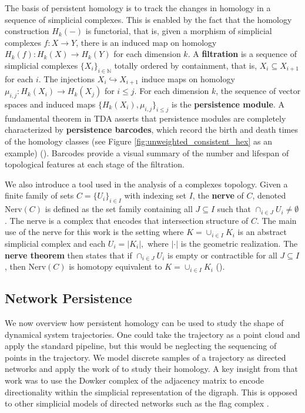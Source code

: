 \documentclass[pdflatex,bst/sn-mathphys-num]{sn-jnl}%
\theoremstyle{thmstyleone}%
\theoremstyle{definition}
\theoremstyle{thmstyletwo}%
\theoremstyle{thmstylethree}%
\begin{document}
The basis of persistent homology is to track the changes in homology in a sequence of simplicial complexes. This is enabled by the fact that the homology construction $H_k(-)$ is functorial, that is, given a morphism of simplicial complexes $f : X \to Y$, there is an induced map on homology $H_k(f) : H_k(X) \to H_k(Y)$ for each dimension $k$. A \textbf{filtration} is a sequence of simplicial complexes $\{X_i\}_{i \in \mathbb{N}}$ totally ordered by containment, that is, $X_i\subseteq X_{i+1}$ for each $i$. The injections $X_i \hookrightarrow X_{i+1}$ induce maps on homology $\mu_{i,j} : H_k(X_i) \to H_k(X_j)$ for $i \leq j$. For each dimension $k$, the sequence of vector spaces and induced maps $\{H_k(X_i), \mu_{i,j}\}_{i \leq j}$ is the \textbf{persistence module}. A fundamental theorem in TDA asserts that persistence modules are completely characterized by \textbf{persistence barcodes}, which record the birth and death times of the homology classes (see Figure \ref{fig:unweighted_consistent_hex} as an example) (\cite{edelsbrunner2010computational}). Barcodes provide a visual summary of the number and lifespan of topological features at each stage of the filtration. 

We also introduce a tool used in the analysis of a complexes topology. Given a finite family of sets $C=\{U_i\}_{i\in I}$ with indexing set $I$, the \textbf{nerve} of $C$, denoted  Nerv$(C)$ is defined as the set family containing all $J\subseteq I$ such that $\cap_{i\in J}U_i\neq \emptyset$. The nerve is a complex that encodes that intersection structure of $C$. The main use of the nerve for this work is the setting where $K=\cup_{i\in I}K_i$ is an abstract simplicial complex and each $U_i=|K_i|,$ where $|\cdot|$ is the geometric realization.  The \textbf{nerve theorem} then states that if $\cap_{i\in J} U_i$ is empty or contractible for all $J\subseteq I$, then Nerv$(C)$ is homotopy equivalent to $K=\cup_{i\in I}K_i$ (\cite{Borsuk1948}).


\subsection{Network Persistence}\label{sec:network_persistence}

We now overview how persistent homology can be used to study the shape of dynamical system trajectories. One could take the trajectory as a point cloud and apply the standard pipeline, but this would be neglecting the sequencing of points in the trajectory. We model discrete samples of a trajectory as directed networks and apply the work of \cite{chowdhury2018AsymNets} to study their homology. A key insight from that work was to use the Dowker complex of the adjacency matrix to encode directionality within the simplicial representation of the digraph. This is opposed to other simplicial models of directed networks such as the flag complex \cite{luet2019Flagser}.
\end{document}
